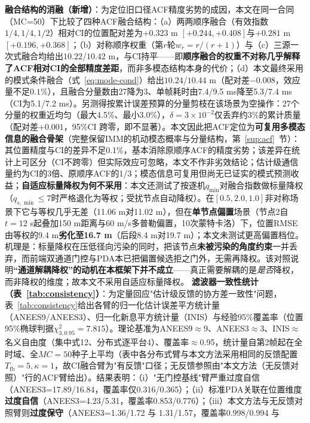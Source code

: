 \documentclass[UTF8,a4paper,zihao=-4]{ctexart}
\begin{document}
\begin{enumerate}
\textbf{融合结构的消融（新增）}：为定位旧口径ACF精度劣势的成因，本文在同一合同（MC=50）下比较了四种ACF融合结构：（a）两两顺序融合（有效指数$1/4,1/4,1/2$）相对CI的位置配对差为$+0.323$ m $[+0.244,+0.408]$与$+0.281$ m $[+0.196,+0.368]$；（b）对称顺序权重（第$r$轮$w_r=r/(r+1)$）与（c）三源一次式融合均给出$10.22$/$10.42$ m，与CI持平——即\textbf{顺序融合的权重不对称几乎解释了ACF相对CI的全部精度差距}，而非多模态结构本身的代价；（d）本文最终采用的模式条件融合（式~\eqref{eq:mode-cond}）给出$10.24$/$10.44$ m（配对差$-0.008$，效应量不足$0.1\%$），且融合分量数由27降为3、单帧耗时由7.4/9.5 ms降至5.3/7.4 ms（CI为5.1/7.2 ms）。另测得按累计误差预算的分量剪枝在该场景为空操作：27个分量的权重近均匀（最大4.5\%、最小3.0\%），$\delta=3\times10^{-2}$仅丢弃约3\%的累计质量（配对差$+0.001$，95\%CI 跨零，即不显著）。本文因此把ACF定位为\textbf{可复用多模态信息的融合骨架}（完整保留IMM的机动模态概率与分量结构，第~\ref{sup:acf}~节）：其位置精度与CI的差异不足0.1\%，基本消除原顺序ACF的精度劣势；该差异在统计上可区分（CI不跨零）但实际效应可忽略，本文不作非劣效结论；估计级通信量约为CI的3倍、原顺序ACF的1/3；模态信息可复用但尚无已证实的模式预测收益；\textbf{自适应标量降权为何不采用}：本文还测试了按逐机$q_{\min}$对融合指数做标量降权（\(q_{s,\min}\le7\)时严格退化为等权；受扰节点自动降权）。在$[0.5,2.0,1.0]$非对称场景下它与等权几乎无差（11.06 m对11.02 m），但在\textbf{单节点偏置}场景（节点2自$t=12$ s起叠加150 m距离与60 m/s多普勒偏置，10次蒙特卡洛）下，位置RMSE由等权的9.4 m\textbf{劣化至16.7 m}（后段8.4 m对19.7 m）；本文未测试更高偏置档位。机理是：标量降权在压低径向污染的同时，把该节点\textbf{未被污染的角度约束}一并丢弃，而前端双通道门控与PDA本已把偏置候选拒之门外，无需再降权。该对照说明\textbf{“通道解耦降权”的动机在本框架下并不成立}——真正需要解耦的是\emph{是否}降权，而非降权的维度；故本文不采用自适应标量降权。 \textbf{滤波器一致性统计（表~\ref{tab:consistency}）}：为定量回应"估计级反馈的协方差一致性"问题，表~\ref{tab:consistency}给出各臂的归一化估计误差平方统计量（ANEES9/ANEES3）、归一化新息平方统计量（INIS）与经验95\%覆盖率（位置95\%椭球判据$\chi^2_{3,0.95}=7.815$）。理论基准为ANEES9$\approx$9、ANEES3$\approx$3、INIS$\approx$名义自由度（集中式12、分布式逐平台4）、覆盖率$\approx$0.95，统计量自第2帧起在全时域、全$MC=50$种子上平均（表中各分布式臂与本文方法采用相同的反馈配置$T_{\mathrm{fb}}=5,\kappa=1$，故CI融合臂为"有反馈"口径；无反馈参照由"本文方法（无反馈对照）"行的ACF臂给出）。结果表明：（i）"无门控基线"臂严重过度自信（ANEES3=17.89/16.84，覆盖率仅0.316/0.365）；（ii）标准PDA关联在位置维度\textbf{过度自信}（ANEES3=4.23/5.31，覆盖率0.853/0.776）；（iii）本文方法与无反馈对照臂则\textbf{过度保守}（ANEES3=1.36/1.72 与 1.31/1.57，覆盖率0.998/0.994 与 
\end{enumerate}
\end{document}
